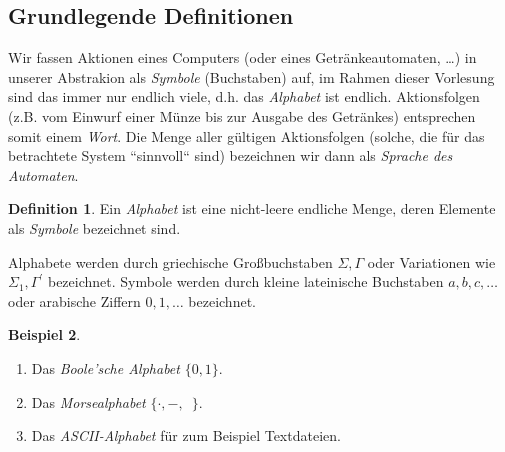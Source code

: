 \documentclass[11pt, a4paper]{article}
\theoremstyle{definition}
\newtheorem{definition}{Definition}[section]
\newtheorem{example}[definition]{Beispiel}
\theoremstyle{plain}
\numberwithin{equation}{section}
\begin{document}
\subsection{Grundlegende Definitionen}\label{sec:awl_def}
Wir fassen Aktionen eines Computers (oder eines Getränkeautomaten, \ldots) in unserer Abstrakion als \textit{Symbole} (Buchstaben) auf, im Rahmen dieser Vorlesung sind das immer nur endlich viele, d.h. das \textit{Alphabet} ist endlich. Aktionsfolgen (z.B. vom Einwurf einer Münze bis zur Ausgabe des Getränkes) entsprechen somit einem \textit{Wort}. Die Menge aller gültigen Aktionsfolgen (solche, die für das betrachtete System ``sinnvoll`` sind) bezeichnen wir dann als \textit{Sprache des Automaten}.
\begin{definition}
	Ein \textit{Alphabet} ist eine nicht-leere endliche Menge, deren Elemente als \textit{Symbole} bezeichnet sind.
\end{definition}
Alphabete werden durch griechische Großbuchstaben $\Sigma, \Gamma$ oder Variationen wie $\Sigma_1, \Gamma^\prime$ bezeichnet. Symbole werden durch kleine lateinische Buchstaben $a, b, c, \ldots$ oder arabische Ziffern $0, 1, \ldots$ bezeichnet.
\begin{example}
	\
	\begin{enumerate}
		\item Das \textit{Boole'sche Alphabet} $\{ 0, 1 \}$.
		\item Das \textit{Morsealphabet} $\{ \cdot, -, \,\,\, \}$.
		\item Das \textit{ASCII-Alphabet} für zum Beispiel Textdateien.
	\end{enumerate}
\end{example}
\end{document}
